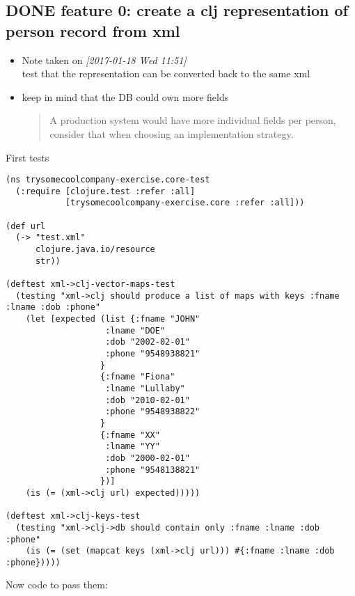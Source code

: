 \documentclass[11pt]{article}
\begin{document}
\subsection{{\bfseries\sffamily DONE} feature 0: create a clj representation of person record from xml}
\label{sec:org561f138}
\begin{itemize}
\item Note taken on \textit{[2017-01-18 Wed 11:51] } \\
test that the representation can be converted back to the same xml
\end{itemize}


\begin{itemize}
\item keep in mind that the DB could own more fields
\begin{quote}
  A production system would have more individual fields per person,
consider that when choosing an implementation strategy.
\end{quote}
\end{itemize}

First tests

\begin{verbatim}
(ns trysomecoolcompany-exercise.core-test
  (:require [clojure.test :refer :all]
            [trysomecoolcompany-exercise.core :refer :all]))

(def url 
  (-> "test.xml"
      clojure.java.io/resource
      str))

(deftest xml->clj-vector-maps-test
  (testing "xml->clj should produce a list of maps with keys :fname :lname :dob :phone"
    (let [expected (list {:fname "JOHN" 
                    :lname "DOE" 
                    :dob "2002-02-01"
                    :phone "9548938821"
                   } 
                   {:fname "Fiona"
                    :lname "Lullaby"
                    :dob "2010-02-01"
                    :phone "9548938822"
                   }
                   {:fname "XX"
                    :lname "YY"
                    :dob "2000-02-01"
                    :phone "9548138821"
                   })]
    (is (= (xml->clj url) expected)))))

(deftest xml->clj-keys-test
  (testing "xml->clj->db should contain only :fname :lname :dob :phone"
    (is (= (set (mapcat keys (xml->clj url))) #{:fname :lname :dob :phone}))))
\end{verbatim}

Now code to pass them:
\end{document}
